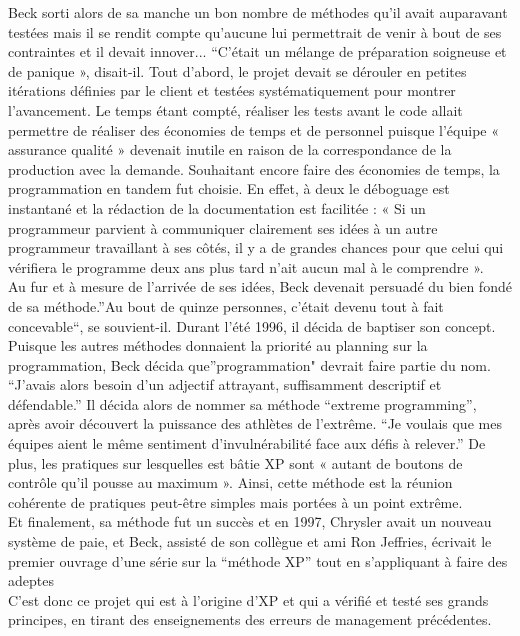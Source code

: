 \documentclass[]{article}
\begin{document}
Beck sorti alors de sa manche un bon nombre de méthodes qu'il avait
auparavant testées mais il se rendit compte qu'aucune lui permettrait de
venir à bout de ses contraintes et il devait innover... ``C'était un
mélange de préparation soigneuse et de panique », disait-il. Tout
d'abord, le projet devait se dérouler en petites itérations définies par
le client et testées systématiquement pour montrer l'avancement. Le
temps étant compté, réaliser les tests avant le code allait permettre de
réaliser des économies de temps et de personnel puisque l'équipe «
assurance qualité » devenait inutile en raison de la correspondance de
la production avec la demande. Souhaitant encore faire des économies de
temps, la programmation en tandem fut choisie. En effet, à deux le
déboguage est instantané et la rédaction de la documentation est
facilitée : « Si un programmeur parvient à communiquer clairement ses
idées à un autre programmeur travaillant à ses côtés, il y a de grandes
chances pour que celui qui vérifiera le programme deux ans plus tard
n'ait aucun mal à le comprendre ».~~\\
Au fur et à mesure de l'arrivée de ses idées, Beck devenait persuadé du
bien fondé de sa méthode.''Au bout de quinze personnes, c'était devenu
tout à fait concevable``, se souvient-il. Durant l'été 1996, il décida
de baptiser son concept. Puisque les autres méthodes donnaient la
priorité au planning sur la programmation, Beck décida
que''programmation" devrait faire partie du nom. ``J'avais alors besoin
d'un adjectif attrayant, suffisamment descriptif et défendable.'' Il
décida alors de nommer sa méthode ``extreme programming'', après avoir
découvert la puissance des athlètes de l'extrême. ``Je voulais que mes
équipes aient le même sentiment d'invulnérabilité face aux défis à
relever.'' De plus, les pratiques sur lesquelles est bâtie XP sont «
autant de boutons de contrôle qu'il pousse au maximum ». Ainsi, cette
méthode est la réunion cohérente de pratiques peut-être simples mais
portées à un point extrême.\\
Et finalement, sa méthode fut un succès et en 1997, Chrysler avait un
nouveau système de paie, et Beck, assisté de son collègue et ami Ron
Jeffries, écrivait le premier ouvrage d'une série sur la ``méthode XP''
tout en s'appliquant à faire des adeptes\\
C'est donc ce projet qui est à l'origine d'XP et qui a vérifié et testé
ses grands principes, en tirant des enseignements des erreurs de
management précédentes.~
\end{document}
